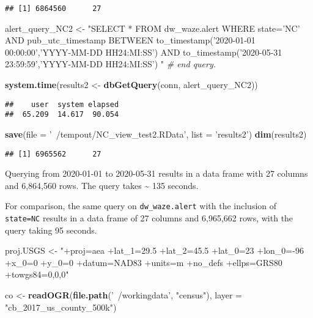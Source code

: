 \documentclass[]{article}
\newenvironment{Shaded}{\begin{snugshade}}{\end{snugshade}}
\newcommand{\CommentTok}[1]{\textcolor[rgb]{0.56,0.35,0.01}{\textit{#1}}}
\newcommand{\DataTypeTok}[1]{\textcolor[rgb]{0.13,0.29,0.53}{#1}}
\newcommand{\KeywordTok}[1]{\textcolor[rgb]{0.13,0.29,0.53}{\textbf{#1}}}
\newcommand{\NormalTok}[1]{#1}
\newcommand{\StringTok}[1]{\textcolor[rgb]{0.31,0.60,0.02}{#1}}
\begin{document}
\begin{verbatim}
## [1] 6864560      27
\end{verbatim}

\begin{Shaded}
\begin{Highlighting}[]
\NormalTok{alert_query_NC2 <-}\StringTok{ "SELECT * FROM dw_waze.alert}
\StringTok{                    WHERE state='NC'}
\StringTok{                    AND pub_utc_timestamp BETWEEN to_timestamp('2020-01-01 00:00:00','YYYY-MM-DD HH24:MI:SS') }
\StringTok{                                          AND     to_timestamp('2020-05-31 23:59:59','YYYY-MM-DD HH24:MI:SS')}
\StringTok{                      "} \CommentTok{# end query. }

\KeywordTok{system.time}\NormalTok{(results2 <-}\StringTok{ }\KeywordTok{dbGetQuery}\NormalTok{(conn, alert_query_NC2))}
\end{Highlighting}
\end{Shaded}

\begin{verbatim}
##    user  system elapsed 
##  65.209  14.617  90.054
\end{verbatim}

\begin{Shaded}
\begin{Highlighting}[]
\KeywordTok{save}\NormalTok{(}\DataTypeTok{file =} \StringTok{'~/tempout/NC_view_test2.RData'}\NormalTok{, }\DataTypeTok{list =} \StringTok{'results2'}\NormalTok{)}
\KeywordTok{dim}\NormalTok{(results2)}
\end{Highlighting}
\end{Shaded}

\begin{verbatim}
## [1] 6965562      27
\end{verbatim}

Querying from 2020-01-01 to 2020-05-31 results in a data frame with 27
columns and 6,864,560 rows. The query takes \textasciitilde{} 135
seconds.

For comparison, the same query on \texttt{dw\_waze.alert} with the
inclusion of \texttt{state=NC} results in a data frame of 27 columns and
6,965,662 rows, with the query taking 95 seconds.

\begin{Shaded}
\begin{Highlighting}[]
\NormalTok{proj.USGS <-}\StringTok{ "+proj=aea +lat_1=29.5 +lat_2=45.5 +lat_0=23 +lon_0=-96 +x_0=0 +y_0=0 +datum=NAD83 +units=m +no_defs +ellps=GRS80 +towgs84=0,0,0"}

\NormalTok{co <-}\StringTok{ }\KeywordTok{readOGR}\NormalTok{(}\KeywordTok{file.path}\NormalTok{(}\StringTok{'~/workingdata'}\NormalTok{, }\StringTok{"census"}\NormalTok{), }\DataTypeTok{layer =} \StringTok{"cb_2017_us_county_500k"}\NormalTok{)}
\end{Highlighting}
\end{Shaded}
\end{document}
